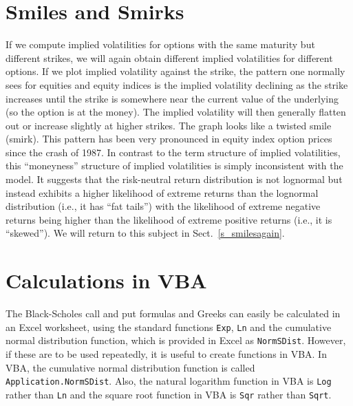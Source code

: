 \section{Smiles and Smirks}\label{s_smiles}
If we compute implied volatilities for options  with the same maturity but different strikes, we will again obtain different implied volatilities for different options.  If we plot implied volatility against the strike, the pattern one normally sees for equities and equity indices is the implied volatility declining as the strike increases until the strike is somewhere near the current value of the underlying (so the option is at the money).  The implied volatility will then generally flatten out or increase slightly at higher strikes.  The graph looks like a twisted smile (smirk).    This pattern has been very pronounced in equity index option prices since the crash of 1987.  In contrast to the term structure of implied volatilities, this ``moneyness'' structure of implied volatilities is simply inconsistent with the model.  It suggests that the risk-neutral return distribution is not lognormal but instead exhibits a higher likelihood of extreme returns than the lognormal distribution (i.e., it has ``fat tails'') with the likelihood of extreme negative returns being higher than the likelihood of extreme positive returns (i.e., it is ``skewed'').  We will return to this subject in Sect.~\ref{s_smilesagain}.


\section{Calculations in VBA}\label{s_blackscholes_vba}

The Black-Scholes call and put formulas and Greeks can easily be calculated in an Excel worksheet, using the standard functions \verb!Exp!, \verb!Ln! and the cumulative normal distribution function, which  is provided in Excel as \verb!NormSDist!.  However, if these are to be used repeatedly, it is useful to create functions in VBA.   In VBA, the cumulative normal distribution function is called \verb!Application.NormSDist!.  Also, the natural logarithm function in VBA is \verb!Log! rather than \verb!Ln! and the square root function in VBA is \verb!Sqr! rather than \verb!Sqrt!.


